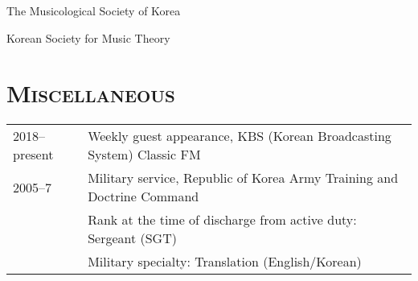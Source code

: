 \documentclass[a4paper,11pt,draft]{article}
\begin{document}
  \noindent The Musicological Society of Korea
  
  \noindent Korean Society for Music Theory
  
  
  \section*{\textsc{Miscellaneous}}
  
  \hspace*{-0.25cm}
  \begin{tabular}{p{2.5cm} l}
    2018–present & Weekly guest appearance, KBS (Korean Broadcasting System)
    Classic FM\\
    
    2005–7 & Military service, Republic of Korea Army Training and Doctrine
    Command\\
    & Rank at the time of discharge from active duty: Sergeant (SGT)\\
    & Military specialty: Translation (English/Korean)
  \end{tabular}
\end{document}
